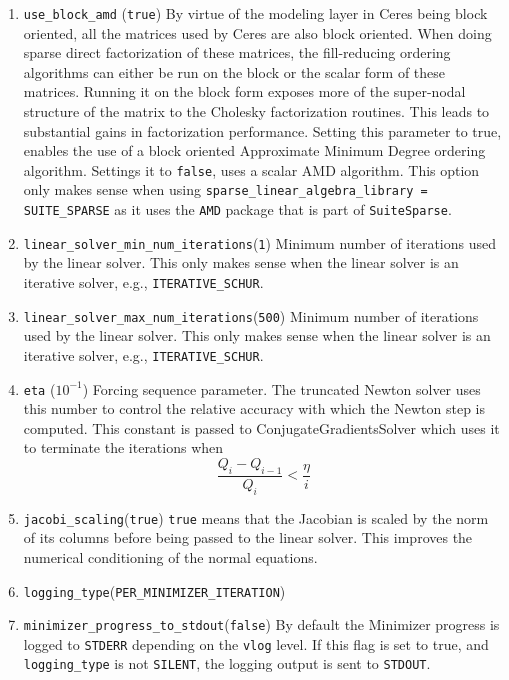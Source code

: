 \begin{enumerate}
\item{\texttt{use\_block\_amd} (\texttt{true})} By virtue of the modeling layer in Ceres being block oriented,
all the matrices used by Ceres are also block oriented.
When doing sparse direct factorization of these matrices, the
fill-reducing ordering algorithms can either be run on the
block or the scalar form of these matrices. Running it on the
block form exposes more of the super-nodal structure of the
matrix to the Cholesky factorization routines. This leads to
substantial gains in factorization performance. Setting this parameter to true, enables the use of a block oriented Approximate Minimum Degree ordering algorithm. Settings it to \texttt{false}, uses a scalar AMD algorithm. This option only makes sense when using \texttt{sparse\_linear\_algebra\_library = SUITE\_SPARSE} as it uses the \texttt{AMD} package that is part of \texttt{SuiteSparse}.

\item{\texttt{linear\_solver\_min\_num\_iterations}}(\texttt{1}) Minimum number of iterations used by the linear solver. This only makes sense when the linear solver is an iterative solver, e.g., \texttt{ITERATIVE\_SCHUR}.

\item{\texttt{linear\_solver\_max\_num\_iterations}}(\texttt{500}) Minimum number of iterations used by the linear solver. This only makes sense when the linear solver is an iterative solver, e.g., \texttt{ITERATIVE\_SCHUR}.

\item{\texttt{eta}} ($10^{-1}$)
 Forcing sequence parameter. The truncated Newton solver uses
    this number to control the relative accuracy with which the
     Newton step is computed. This constant is passed to ConjugateGradientsSolver which uses
     it to terminate the iterations when
\begin{equation}    
      \frac{Q_i - Q_{i-1}}{Q_i} < \frac{\eta}{i}
\end{equation}

\item{\texttt{jacobi\_scaling}}(\texttt{true}) \texttt{true} means that the Jacobian is scaled by the norm of its columns before being passed to the linear solver. This improves the numerical conditioning of the normal equations.

\item{\texttt{logging\_type}}(\texttt{PER\_MINIMIZER\_ITERATION})


\item{\texttt{minimizer\_progress\_to\_stdout}}(\texttt{false})
By default the Minimizer progress is logged to \texttt{STDERR} depending on the \texttt{vlog} level. If this flag is
set to true, and \texttt{logging\_type} is not \texttt{SILENT}, the logging output
is sent to \texttt{STDOUT}.


\end{enumerate}
